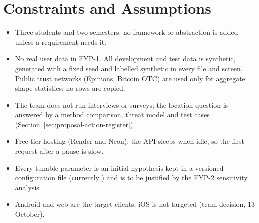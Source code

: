 \section{Constraints and Assumptions}\label{sec:constraints-assumptions}
\begin{itemize}
\item Three students and two semesters: no framework or abstraction is added unless a requirement needs it.
\item No real user data in FYP-1. All development and test data is synthetic, generated with a fixed seed and labelled synthetic in every file and screen. Public trust networks (Epinions, Bitcoin OTC) are used only for aggregate shape statistics; no rows are copied.
\item The team does not run interviews or surveys; the location question is answered by a method comparison, threat model and test cases (Section~\ref{sec:proposal-action-register}).
\item Free-tier hosting (Render and Neon); the API sleeps when idle, so the first request after a pause is slow.
\item Every tunable parameter is an initial hypothesis kept in a versioned configuration file (currently ) and is to be justified by the FYP-2 sensitivity analysis.
\item Android and web are the target clients; iOS is not targeted (team decision, 13 October).
\end{itemize}


